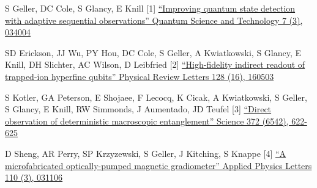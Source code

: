 

\begin{cventries}

  \cventry
  {S Geller, DC Cole, S Glancy, E Knill}
    {[1]} %
    {} %
    {}
    {\href{https://www.doi.org/10.1088/2058-9565/ac6972}{``Improving quantum state detection with adaptive sequential observations'' Quantum Science and Technology 7 (3), 034004}}

  \cventry
  {SD Erickson, JJ Wu, PY Hou, DC Cole, S Geller, A Kwiatkowski, S Glancy, E Knill, DH Slichter, AC Wilson, D Leibfried}
  {[2]}
  {}
  {}
  {\href{https://doi.org/10.1103/PhysRevLett.128.160503}{``High-fidelity indirect readout of trapped-ion hyperfine qubits'' Physical Review Letters 128 (16), 160503}}

  \cventry
  {S Kotler, GA Peterson, E Shojaee, F Lecocq, K Cicak, A Kwiatkowski,
    S Geller, S Glancy, E Knill, RW Simmonds, J Aumentado, JD Teufel}
  {[3]}
  {}
  {}
  {\href{https://doi.org/10.1126/science.abf2998}{``Direct observation of deterministic macroscopic entanglement'' Science 372 (6542), 622-625}}

  \cventry
  {D Sheng, AR Perry, SP Krzyzewski, S Geller, J Kitching, S Knappe}
  {[4]}
  {}
  {}
  {\href{https://doi.org/10.1063/1.4974349}{``A microfabricated optically-pumped magnetic gradiometer'' Applied Physics Letters 110 (3), 031106}}

\end{cventries}
